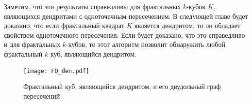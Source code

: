 \begin{remark}
Заметим, что эти результаты справедливы для фрактальных $k$-кубов $K$, являющихся дендритами с одноточечным пересечением.
В следующей главе будет доказано, что если фрактальный квадрат $K$ является дендритом, то он обладает свойством одноточечного пересечения.
Если будет доказано, что это справедливо и для фрактальных $k$-кубов, то этот алгоритм позволит обнаружить любой фрактальный $k$-куб, являющийся дендритом.
\end{remark}

\begin{figure}[H]
    \centering
\texttt{[image: FQ\_den.pdf]}
    \caption{Фрактальный куб, являющийся дендритом, и его двудольный граф пересечений}
    \label{fig:BMM2022}
\end{figure}

% 
%
